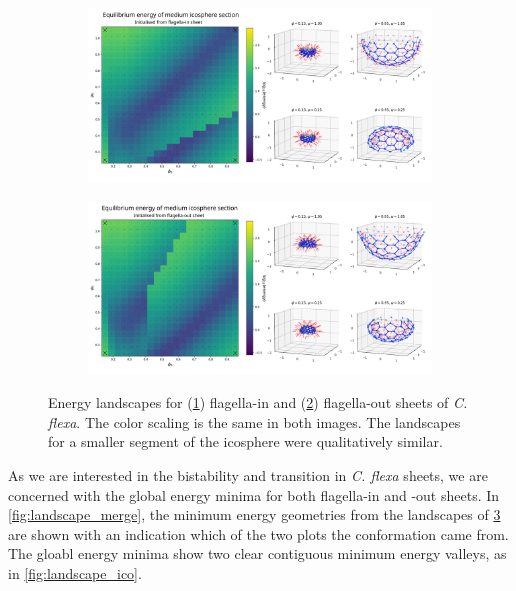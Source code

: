 \begin{figure}
	\centering
	\begin{subfigure}[b]{\textwidth}
		\centering
		\includegraphics[width=\textwidth]{landscape_ico3.png}
		\caption{}
		\label{subfig:landscape_ico3}
	\end{subfigure}
	\begin{subfigure}[b]{\textwidth}
		\centering
		\includegraphics[width=\textwidth]{landscape_ico3r.png}
		\caption{}
		\label{subfig:landscape_ico3r}
	\end{subfigure}
	\caption[Energy landscape for flagella-in and flagella-out curved sheets]{Energy landscapes for (\ref{subfig:landscape_ico3}) flagella-in and (\ref{subfig:landscape_ico3r}) flagella-out sheets of \textit{C. flexa}. The color scaling is the same in both images. The landscapes for a smaller segment of the icosphere were qualitatively similar.}
	\label{fig:landscape_ico3}
\end{figure}

As we are interested in the bistability and transition in \textit{C. flexa} sheets, we are concerned with the global energy minima for both flagella-in and -out sheets. 
In \cref{fig:landscape_merge}, the minimum energy geometries from the landscapes of \cref{fig:landscape_ico3} are shown with an indication which of the two plots the conformation came from.
The gloabl energy minima show two clear contiguous minimum energy valleys, as in \cref{fig:landscape_ico}.

